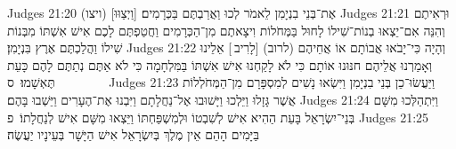 Judges 21:20	(ויצו) [וַיְצַוּוּ] אֶת־בְּנֵי בִנְיָמִן לֵאמֹר לְכוּ וַאֲרַבְתֶּם בַּכְּרָמִים׃
Judges 21:21	וּרְאִיתֶם וְהִנֵּה אִם־יֵצְאוּ בְנוֹת־שִׁילוֹ לָחוּל בַּמְּחֹלוֹת וִיצָאתֶם מִן־הַכְּרָמִים וַחֲטַפְתֶּם לָכֶם אִישׁ אִשְׁתּוֹ מִבְּנוֹת שִׁילוֹ וַהֲלַכְתֶּם אֶרֶץ בִּנְיָמִן׃
Judges 21:22	וְהָיָה כִּי־יָבֹאוּ אֲבוֹתָם אוֹ אֲחֵיהֶם (לרוב) [לָרִיב ] אֵלֵינוּ וְאָמַרְנוּ אֲלֵיהֶם חנּוּנוּ אוֹתָם כִּי לֹא לָקַחְנוּ אִישׁ אִשְׁתּוֹ בַּמִּלְחָמָה כִּי לֹא אַתֶּם נְתַתֶּם לָהֶם כָּעֵת תֶּאְשָׁמוּ׃ {ס}        
Judges 21:23	וַיַּעֲשׂוּ־כֵן בְּנֵי בִנְיָמִן וַיִּשְׂאוּ נָשִׁים לְמִסְפָּרָם מִן־הַמְּחֹלְלוֹת אֲשֶׁר גָּזָלוּ וַיֵּלְכוּ וַיָּשׁוּבוּ אֶל־נַחֲלָתָם וַיִּבְנוּ אֶת־הֶעָרִים וַיֵּשְׁבוּ בָּהֶם׃
Judges 21:24	וַיִּתְהַלְּכוּ מִשָּׁם בְּנֵי־יִשְׂרָאֵל בָּעֵת הַהִיא אִישׁ לְשִׁבְטוֹ וּלְמִשְׁפַּחְתּוֹ וַיֵּצְאוּ מִשָּׁם אִישׁ לְנַחֲלָתוֹ׃ {פ}
Judges 21:25	בַּיָּמִים הָהֵם אֵין מֶלֶךְ בְּיִשְׂרָאֵל אִישׁ הַיָּשָׁר בְּעֵינָיו יַעֲשֶׂה׃
